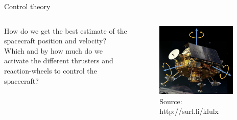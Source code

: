 \documentclass[aspectratio=169]{beamer}
\begin{document}
\begin{frame}{Control theory}
\begin{columns}
\begin{column}{0.5\textwidth}
      How do we get the best estimate of the spacecraft position and velocity? Which and by how much do we activate the different thrusters and reaction-wheels to control the spacecraft?
    \end{column}
    \begin{column}{0.475\textwidth}
      \begin{figure}
        \centering
        \includegraphics[width=0.9\textwidth]{spacecraft.png}
        \caption{\scriptsize Source: http://surl.li/klulx}
      \end{figure}
    \end{column}    
  \end{columns}
\end{frame}
\end{document}
